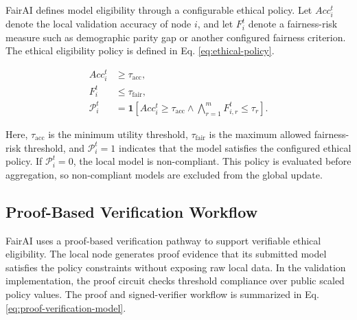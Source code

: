 \documentclass[futureinternet,article,submit,pdftex,moreauthors]{Definitions/mdpi}
\begin{document}
FairAI defines model eligibility through a configurable ethical policy. Let \(Acc_i^t\) denote the local validation accuracy of node \(i\), and let \(F_i^t\) denote a fairness-risk measure such as demographic parity gap or another configured fairness criterion. The ethical eligibility policy is defined in Eq. \eqref{eq:ethical-policy}.

\begin{subequations}
	\label{eq:ethical-policy}
	\begin{align}
		Acc_i^t
		&\geq
		\tau_{\mathrm{acc}},
		\label{eq:accuracy-policy}
		\\
		F_i^t
		&\leq
		\tau_{\mathrm{fair}},
		\label{eq:fairness-policy}
		\\
		\mathcal{P}_i^t
		&=
		\mathbf{1}
		\left[
		Acc_i^t \geq \tau_{\mathrm{acc}}
		\land
		\bigwedge_{r=1}^{m}
		F_{i,r}^t \leq \tau_r
		\right].
		\label{eq:policy-indicator}
	\end{align}
\end{subequations}

Here, \(\tau_{\mathrm{acc}}\) is the minimum utility threshold, \(\tau_{\mathrm{fair}}\) is the maximum allowed fairness-risk threshold, and \(\mathcal{P}_i^t=1\) indicates that the model satisfies the configured ethical policy. If \(\mathcal{P}_i^t=0\), the local model is non-compliant. This policy is evaluated before aggregation, so non-compliant models are excluded from the global update.

\subsection{Proof-Based Verification Workflow}
\label{subsec:proof-based-verification}

FairAI uses a proof-based verification pathway to support verifiable ethical eligibility. The local node generates proof evidence that its submitted model satisfies the policy constraints without exposing raw local data. In the validation implementation, the proof circuit checks threshold compliance over public scaled policy values. The proof and signed-verifier workflow is summarized in Eq. \eqref{eq:proof-verification-model}.
\end{document}
